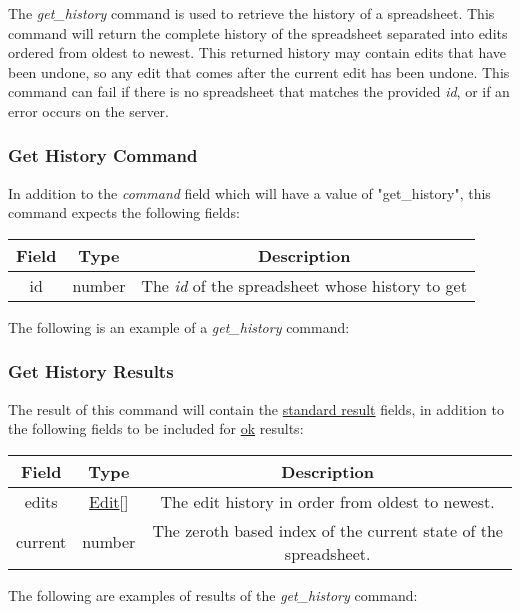 The \emph{get\_history} command is used to retrieve the history of a spreadsheet. 
This command will return the complete history of the spreadsheet separated 
into edits ordered from oldest to newest. This returned history may contain 
edits that have been undone, so any edit that comes after the current edit 
has been undone. This command can fail if there is no spreadsheet that matches 
the provided \emph{id}, or if an error occurs on the server.

\subsubsection{Get History Command}
In addition to the \emph{command} field which will have a value of "get\_history", this command expects the following fields:
\begin{table}[H]
    \begin{center}
        \begin{tabular}{|c|c|c|}\hline
            Field & Type & Description \\\hline
            id & number & The \emph{id} of the spreadsheet whose history to get \\\hline
        \end{tabular}
    \end{center}
\end{table}

The following is an example of a \emph{get\_history} command:


\subsubsection{Get History Results}
The result of this command will contain the \hyperref[sec:message:result]{standard result} fields, in addition to the following fields to be included for \underline{ok} results:
\begin{table}[H]
    \begin{center}
        \begin{tabular}{|c|c|c|}\hline
            Field & Type & Description \\\hline
            edits & \hyperref[sec:message:edits]{Edit}[] & The edit history in order from oldest to newest. \\\hline
            current & number & The zeroth based index of the current state of the spreadsheet. \\\hline
        \end{tabular}
    \end{center}
\end{table}

The following are examples of results of the \emph{get\_history} command:



